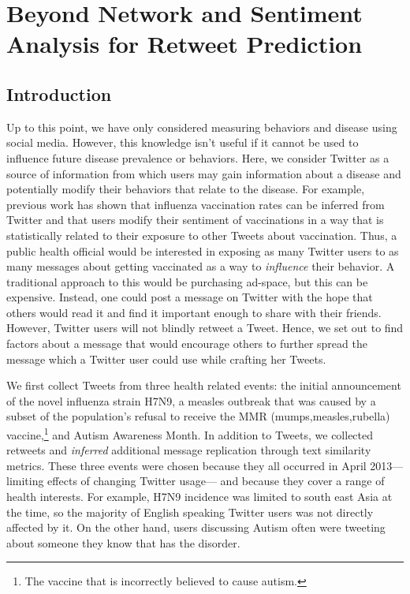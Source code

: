 \chapter{Beyond Network and Sentiment Analysis for Retweet Prediction}
\label{retweets}
\section{Introduction}

Up to this point, we have only considered measuring behaviors and disease using social media. However, this knowledge isn't useful if it cannot be used to influence future disease prevalence or behaviors. Here, we consider Twitter as a source of information from which users may gain information about a disease and potentially modify their behaviors that relate to the disease. \cite{salathe2013dynamics,timimi2013shape} For example, previous work has shown that influenza vaccination rates can be inferred from Twitter \cite{salathe2011assessing} and that users modify their sentiment of vaccinations in a way that is statistically related to their exposure to other Tweets about vaccination. \cite{salathe2013dynamics} Thus, a public health official would be interested in exposing as many Twitter users to as many messages about getting vaccinated as a way to \emph{influence} their behavior. \cite{timimi2013shape} A traditional approach to this would be purchasing ad-space, but this can be expensive. Instead, one could post a message on Twitter with the hope that others would read it and find it important enough to share with their friends. However, Twitter users will not blindly retweet a Tweet. Hence, we set out to find factors about a message that would encourage others to further spread the message which a Twitter user could use while crafting her Tweets.

We first collect Tweets from three health related events: the initial announcement of the novel influenza strain H7N9, a measles outbreak that was caused by a subset of the population's refusal to receive the MMR (mumps,measles,rubella) vaccine,\footnote{The vaccine that is incorrectly believed to cause autism.} and Autism Awareness Month. In addition to Tweets, we collected retweets and \emph{inferred} additional message replication through text similarity metrics. These three events were chosen because they all occurred in April 2013---limiting effects of changing Twitter usage--- and because they cover a range of health interests. For example, H7N9 incidence was limited to south east Asia at the time, so the majority of English speaking Twitter users was not directly affected by it. On the other hand, users discussing Autism often were tweeting about someone they know that has the disorder. 

